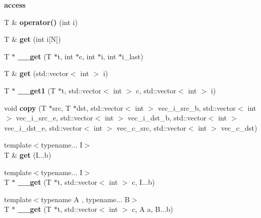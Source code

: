 \begin{Indent}{\bf access}\par
{\em \label{_amgrp9df3b01c60df20d13843841ff0d4482c}
 }\begin{DoxyCompactItemize}
\item 
\hypertarget{class____array_a2640e620004e448f2c9d70e2d048c91e}{
T \& {\bfseries operator()} (int i)}
\label{class____array_a2640e620004e448f2c9d70e2d048c91e}

\item 
\hypertarget{class____array_ab8aa25dbb4bf56dd2df5dca22112deaf}{
T \& {\bfseries get} (int i\mbox{[}N\mbox{]})}
\label{class____array_ab8aa25dbb4bf56dd2df5dca22112deaf}

\item 
\hypertarget{class____array_a048dc1381c0a2e3b8b07d487b6e429b1}{
T $\ast$ {\bfseries \_\-\_\-get} (T $\ast$t, int $\ast$c, int $\ast$i, int $\ast$i\_\-last)}
\label{class____array_a048dc1381c0a2e3b8b07d487b6e429b1}

\item 
\hypertarget{class____array_ac7d5ddda5112a815aef1b8ac55fb3d87}{
T \& {\bfseries get} (std::vector$<$ int $>$ i)}
\label{class____array_ac7d5ddda5112a815aef1b8ac55fb3d87}

\item 
\hypertarget{class____array_a848bc4f4f32da2e95eecd3dd0e375a30}{
T $\ast$ {\bfseries \_\-\_\-get1} (T $\ast$t, std::vector$<$ int $>$ c, std::vector$<$ int $>$ i)}
\label{class____array_a848bc4f4f32da2e95eecd3dd0e375a30}

\item 
\hypertarget{class____array_a27570ec7189428efe483aba5c10de726}{
void {\bfseries copy} (T $\ast$src, T $\ast$dst, std::vector$<$ int $>$ vec\_\-i\_\-src\_\-b, std::vector$<$ int $>$ vec\_\-i\_\-src\_\-e, std::vector$<$ int $>$ vec\_\-i\_\-dst\_\-b, std::vector$<$ int $>$ vec\_\-i\_\-dst\_\-e, std::vector$<$ int $>$ vec\_\-c\_\-src, std::vector$<$ int $>$ vec\_\-c\_\-dst)}
\label{class____array_a27570ec7189428efe483aba5c10de726}

\item 
\hypertarget{class____array_a7fb64a0fa23884f3178a913ab3a09f58}{
{\footnotesize template$<$typename... I$>$ }\\T \& {\bfseries get} (I...b)}
\label{class____array_a7fb64a0fa23884f3178a913ab3a09f58}

\item 
\hypertarget{class____array_a0373a69cb2d5ff45af2736abd00102ea}{
{\footnotesize template$<$typename... I$>$ }\\T $\ast$ {\bfseries \_\-\_\-get} (T $\ast$t, std::vector$<$ int $>$ c, I...b)}
\label{class____array_a0373a69cb2d5ff45af2736abd00102ea}

\item 
\hypertarget{class____array_a70c1493a9b1be6264cae3e140c4b7644}{
{\footnotesize template$<$typename A , typename... B$>$ }\\T $\ast$ {\bfseries \_\-\_\-get} (T $\ast$t, std::vector$<$ int $>$ c, A a, B...b)}
\label{class____array_a70c1493a9b1be6264cae3e140c4b7644}

\end{DoxyCompactItemize}
\end{Indent}
